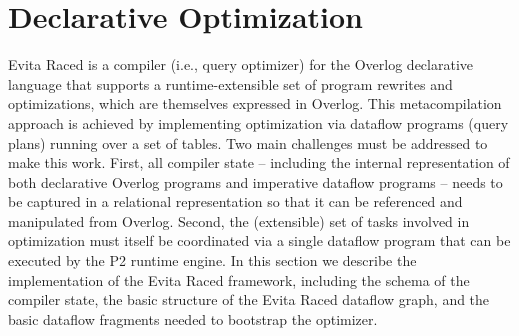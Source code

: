 \documentclass{sigmod08}
\begin{document}
% 
% 


\section{Declarative Optimization}
\label{sec:declopt}
Evita Raced is a compiler (i.e., query optimizer) for the Overlog
declarative language that supports a runtime-extensible set of program
rewrites and optimizations, which are themselves expressed in Overlog.
This metacompilation approach is achieved by implementing optimization
via dataflow programs  (query plans) running over a set of tables.  Two
main challenges must be addressed to make this work.  First, all
compiler state -- including the internal representation of both
declarative Overlog programs and imperative dataflow programs -- needs
to be captured in a relational representation so that it can be
referenced and manipulated from Overlog.  Second, the (extensible) set
of tasks involved in optimization must itself be coordinated via a
single dataflow program that can be executed by the P2 runtime engine.
In this section we describe the implementation of the Evita Raced
framework, including the schema of the compiler state, the basic
structure of the Evita Raced dataflow graph, and the basic dataflow
fragments needed to bootstrap the optimizer.
\end{document}
